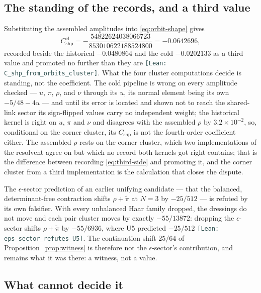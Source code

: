 \documentclass[11pt]{article}
\theoremstyle{plain}
\theoremstyle{definition}
\theoremstyle{remark}
\newcommand{\chk}[1]{}
\newcommand{\leanref}[1]{{\footnotesize\textcolor{DarkSlateGray}{\texttt{[Lean: #1]}}}}
\begin{document}
\subsection{The standing of the records, and a third value}

Substituting the assembled amplitudes into \eqref{eq:orbit-shape} gives
\begin{equation}\label{eq:third-side}
 C^{\mathrm{cl}}_{\mathrm{shp}}
 =-\frac{54822624038066723}{853010622188524800}=-0.0642696,
\end{equation}
recorded beside the historical $-0.0480864$ and the cold $-0.0202133$ as a
third value and promoted no further than they are
\leanref{C\_shp\_from\_orbits\_cluster}. What the four cluster
computations decide is standing, not the coefficient. The cold pipeline is
wrong on every amplitude checked --- $u$, $\pi$, $\rho$, and $\nu$ through
its $u$, its normal element being its own $-5/48-4u$ --- and until its
error is located and shown not to reach the shared-link sector its
sign-flipped values carry no independent weight; the historical kernel is
right on $u$, $\pi$ and $\nu$ and disagrees with the assembled $\rho$ by
$3.2\times10^{-2}$, so, conditional on the corner cluster, its
$C_{\mathrm{shp}}$ is not the fourth-order coefficient either. The assembled $\rho$ rests on the
corner cluster, which two implementations of the resolvent agree on but which
no record both kernels got right contains; that is the difference between
recording \eqref{eq:third-side} and promoting it, and the corner cluster from
a third implementation is the calculation that closes the dispute.
\chk{FINDING: C\_shp from the assembled amplitudes is a third value, -5/96 - u - (rho + pi)/2 with the cluster rho}

The $\epsilon$-sector prediction of an earlier unifying candidate --- that
the balanced, determinant-free contraction shifts $\rho+\tilde\pi$ at $N=3$ by
$-25/512$ --- is refuted by its own falsifier. With every unbalanced Haar
family dropped, the dressings do not move and each pair cluster moves by
exactly $-55/13872$: dropping the $\epsilon$-sector shifts $\rho+\tilde\pi$
by $-55/6936$, where U5 predicted $-25/512$
\leanref{eps\_sector\_refutes\_U5}. The continuation shift $25/64$
of Proposition~\ref{prop:witness} is therefore not the $\epsilon$-sector's
contribution, and remains what it was there: a witness, not a value.
\chk{FINDING: U5 is falsified -- the epsilon sector of rho + pi~ is -55/6936, not -25/512}

\subsection{What cannot decide it}
\end{document}

